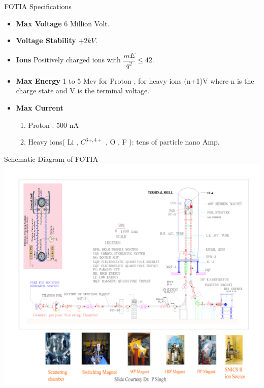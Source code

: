 \documentclass[11pt]{beamer}
\begin{document}
\begin{frame}{FOTIA Specifications}

  \begin{itemize}
   
    \item \textbf{Max Voltage} 6 Million Volt.
    \item \textbf{Voltage Stability} $\underline{+} 2 kV $.
    \item \textbf{Ions} Positively charged ions with $\dfrac{mE}{q^2}   \leqslant 42$.
    \item \textbf{Max Energy} 1 to 5 Mev for Proton , for heavy ions (n+1)V where n is the charge state and V is the terminal voltage.
    \item \textbf{Max Current} 
    \begin{enumerate}
     \item Proton : 500 nA
     \item Heavy ions( Li , $C^{3+,4+}$ , O , F ): tens of particle nano Amp.
    \end{enumerate}
      
   \end{itemize}

\end{frame}

\begin{frame}{Schematic Diagram of FOTIA}
\includegraphics[width=\linewidth]{FOTIA_Page_05.jpg}
\end{frame}
\end{document}
